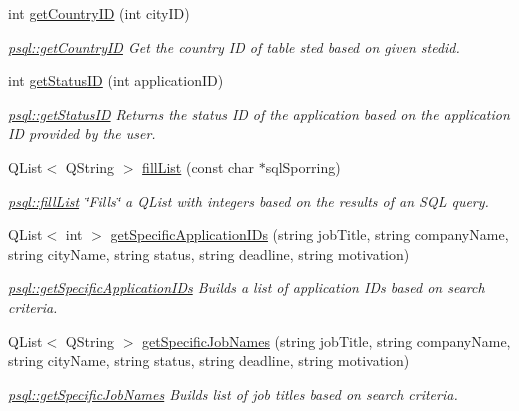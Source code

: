 \begin{DoxyCompactItemize}
int \mbox{\hyperlink{classpsql_a81d02dc0350ba11d90257914078ba432}{get\+Country\+ID}} (int city\+ID)
\begin{DoxyCompactList}\small\item\em \mbox{\hyperlink{classpsql_a81d02dc0350ba11d90257914078ba432}{psql\+::get\+Country\+ID}} Get the country ID of table sted based on given stedid. \end{DoxyCompactList}\item 
int \mbox{\hyperlink{classpsql_a9c02c92c09cb60c35d24375673b7df06}{get\+Status\+ID}} (int application\+ID)
\begin{DoxyCompactList}\small\item\em \mbox{\hyperlink{classpsql_a9c02c92c09cb60c35d24375673b7df06}{psql\+::get\+Status\+ID}} Returns the status ID of the application based on the application ID provided by the user. \end{DoxyCompactList}\item 
Q\+List$<$ Q\+String $>$ \mbox{\hyperlink{classpsql_a2ad41caea89dc5af0b55b12f6394fbf5}{fill\+List}} (const char $\ast$sql\+Sporring)
\begin{DoxyCompactList}\small\item\em \mbox{\hyperlink{classpsql_a2ad41caea89dc5af0b55b12f6394fbf5}{psql\+::fill\+List}} \char`\"{}\+Fills\char`\"{} a Q\+List with integers based on the results of an S\+QL query. \end{DoxyCompactList}\item 
Q\+List$<$ int $>$ \mbox{\hyperlink{classpsql_ab6edb8a2e42d8ac7c4ae29f5b0cb494f}{get\+Specific\+Application\+I\+Ds}} (string job\+Title, string company\+Name, string city\+Name, string status, string deadline, string motivation)
\begin{DoxyCompactList}\small\item\em \mbox{\hyperlink{classpsql_ab6edb8a2e42d8ac7c4ae29f5b0cb494f}{psql\+::get\+Specific\+Application\+I\+Ds}} Builds a list of application I\+Ds based on search criteria. \end{DoxyCompactList}\item 
Q\+List$<$ Q\+String $>$ \mbox{\hyperlink{classpsql_a029f2ef38c4156cc6c67765900c8245f}{get\+Specific\+Job\+Names}} (string job\+Title, string company\+Name, string city\+Name, string status, string deadline, string motivation)
\begin{DoxyCompactList}\small\item\em \mbox{\hyperlink{classpsql_a029f2ef38c4156cc6c67765900c8245f}{psql\+::get\+Specific\+Job\+Names}} Builds list of job titles based on search criteria. \end{DoxyCompactList}\item 

\end{DoxyCompactItemize}
